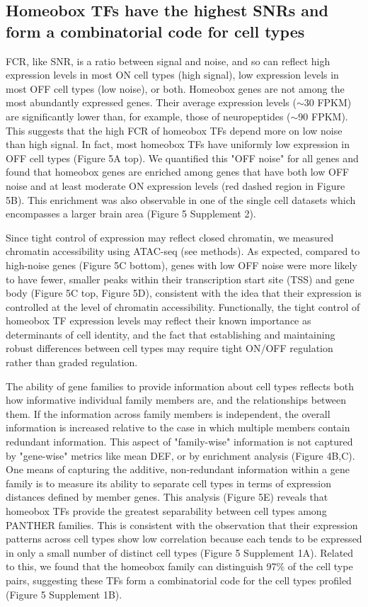\subsection{Homeobox TFs have the highest SNRs and form a combinatorial code for cell types}
FCR, like SNR, is a ratio between signal and noise, and so can reflect high expression levels in most ON cell types (high signal), low expression levels in most OFF cell types (low noise), or both. Homeobox genes are not among the most abundantly expressed genes. Their average expression levels ($\sim$30 FPKM) are significantly lower than, for example, those of neuropeptides ($\sim$90 FPKM). This suggests that the high FCR of homeobox TFs depend more on low noise than high signal. In fact, most homeobox TFs have uniformly low expression in OFF cell types (Figure 5A top). We quantified this "OFF noise" for all genes and found that homeobox genes are enriched among genes that have both low OFF noise and at least moderate ON expression levels (red dashed region in Figure 5B). This enrichment was also observable in one of the single cell datasets which encompasses a larger brain area (Figure 5 Supplement 2). 

Since tight control of expression may reflect closed chromatin, we measured chromatin accessibility using ATAC-seq (see methods). As expected, compared to high-noise genes (Figure 5C bottom), genes with low OFF noise were more likely to have fewer, smaller peaks within their transcription start site (TSS) and gene body (Figure 5C top, Figure 5D), consistent with the idea that their expression is controlled at the level of chromatin accessibility. Functionally, the tight control of homeobox TF expression levels may reflect their known importance as determinants of cell identity, and the fact that establishing and maintaining robust differences between cell types may require tight ON/OFF regulation rather than graded regulation.

The ability of gene families to provide information about cell types reflects both how informative individual family members are, and the relationships between them. If the information across family members is independent, the overall information is increased relative to the case in which multiple members contain redundant information. This aspect of "family-wise" information is not captured by "gene-wise" metrics like mean DEF, or by enrichment analysis (Figure 4B,C). One means of capturing the additive, non-redundant information within a gene family is to measure its ability to separate cell types in terms of expression distances defined by member genes. This analysis (Figure 5E) reveals that homeobox TFs provide the greatest separability between cell types among PANTHER families. This is consistent with the observation that their expression patterns across cell types show low correlation because each tends to be expressed in only a small number of distinct cell types (Figure 5 Supplement 1A). Related to this, we found that the homeobox family can distinguish 97\% of the cell type pairs, suggesting these TFs form a combinatorial code for the cell types profiled (Figure 5 Supplement 1B). 

